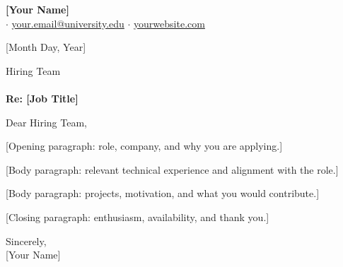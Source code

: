 \documentclass[11pt,letterpaper]{article}
\begin{document}
\textbf{[Your Name]}\\
[City, State] \quad$\cdot$\quad
\href{mailto:your.email@university.edu}{your.email@university.edu} \quad$\cdot$\quad
\href{https://rojaemighty.com}{yourwebsite.com}

\vspace{12pt}
[Month Day, Year]

\vspace{12pt}
Hiring Team\\
[Company Name]\\
[City, State]

\vspace{12pt}
\textbf{Re: [Job Title]}

\vspace{6pt}
Dear Hiring Team,

[Opening paragraph: role, company, and why you are applying.]

[Body paragraph: relevant technical experience and alignment with the role.]

[Body paragraph: projects, motivation, and what you would contribute.]

[Closing paragraph: enthusiasm, availability, and thank you.]

\vspace{6pt}
Sincerely,\\[18pt]
[Your Name]
\end{document}
